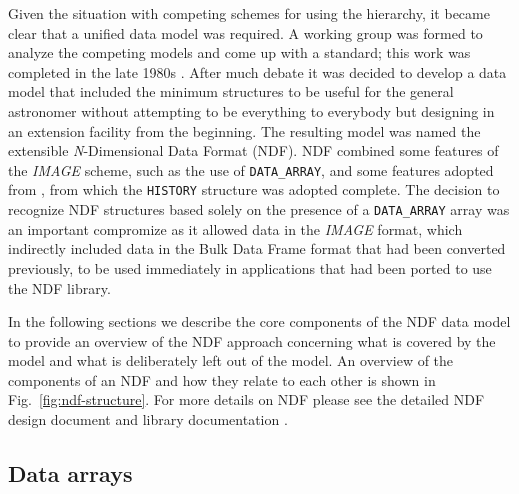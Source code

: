 \documentclass[final,authoryear,5p,times,twocolumn]{elsarticle}
\begin{document}
Given the situation with competing schemes for using the hierarchy, it
became clear that a unified data model was required. A working group
was formed to analyze the competing models and come up with a standard; this work
was completed in the late 1980s \citep{1988STARB...2...11C,SGP38}.
After much debate it was decided to develop a data model that included
the minimum structures to be useful for the general astronomer without
attempting to be everything to everybody but designing in an extension
facility from the beginning. The resulting model was named the
extensible \emph{N}-Dimensional Data Format (NDF).  NDF combined some
features of the \emph{IMAGE} scheme, such as the use of
\texttt{DATA\_ARRAY}, and some features adopted from \asterix, from
which the \texttt{HISTORY} structure was adopted complete.  The
decision to recognize NDF structures  based solely on the presence of a
\texttt{DATA\_ARRAY} array was an important compromize as it allowed
data in the \emph{IMAGE} format, which indirectly included data in the
Bulk Data Frame \citep[BDF;][]{1980SPIE..264...70P,SUN4}
format that had been converted previously, to be used immediately
in applications that had been ported to use the NDF library.

In the following sections we describe the core components of the NDF
data model to provide an overview of the NDF approach concerning what
is covered by the model and what is deliberately left out of the
model. An overview of the components of an NDF and how they relate to
each other is shown in Fig.\ \ref{fig:ndf-structure}. For more details
on NDF please see the detailed NDF design document
\citep[SGP/38;][]{SGP38} and library documentation
\citep[SUN/33;][]{SUN33}.

\subsection{Data arrays}
\end{document}
